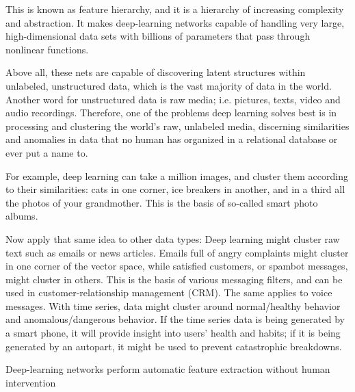 {This is known as feature hierarchy, and it is a hierarchy of increasing complexity and abstraction. It makes deep-learning networks capable of handling very large, high-dimensional data sets with billions of parameters that pass through nonlinear functions.

Above all, these nets are capable of discovering latent structures within unlabeled, unstructured data, which is the vast majority of data in the world. Another word for unstructured data is raw media; i.e. pictures, texts, video and audio recordings. Therefore, one of the problems deep learning solves best is in processing and clustering the world’s raw, unlabeled media, discerning similarities and anomalies in data that no human has organized in a relational database or ever put a name to.

For example, deep learning can take a million images, and cluster them according to their similarities: cats in one corner, ice breakers in another, and in a third all the photos of your grandmother. This is the basis of so-called smart photo albums.

Now apply that same idea to other data types: Deep learning might cluster raw text such as emails or news articles. Emails full of angry complaints might cluster in one corner of the vector space, while satisfied customers, or spambot messages, might cluster in others. This is the basis of various messaging filters, and can be used in customer-relationship management (CRM). The same applies to voice messages. With time series, data might cluster around normal/healthy behavior and anomalous/dangerous behavior. If the time series data is being generated by a smart phone, it will provide insight into users’ health and habits; if it is being generated by an autopart, it might be used to prevent catastrophic breakdowns.

Deep-learning networks perform automatic feature extraction without human intervention


}
